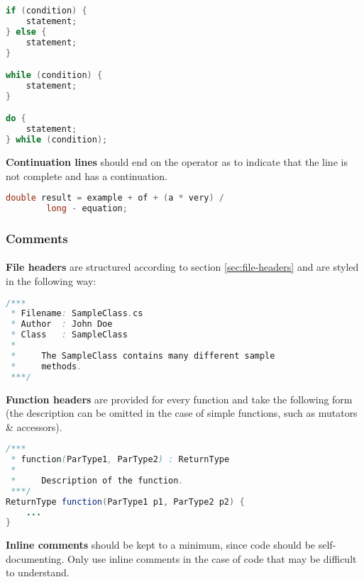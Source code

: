 \documentclass{article}
\begin{document}
    \begin{lstlisting}[language=Java]
if (condition) {
    statement;
} else {
    statement;
}

while (condition) {
    statement;
}

do {
    statement;
} while (condition);
    \end{lstlisting}

    \textbf{Continuation lines} should end on the operator as to indicate that
    the line is not complete and has a continuation.

    \begin{lstlisting}[language=Java]
double result = example + of + (a * very) / 
        long - equation;
    \end{lstlisting}

    \subsubsection{Comments}
    \label{sec:cs-com}

    \paragraph{}
    \textbf{File headers} are structured according to section
    \ref{sec:file-headers} and are styled in the following way:

    \begin{lstlisting}[language=Java]
/***
 * Filename: SampleClass.cs
 * Author  : John Doe
 * Class   : SampleClass
 *
 *     The SampleClass contains many different sample
 *     methods.
 ***/
    \end{lstlisting}

    \textbf{Function headers} are provided for every function and take the
    following form (the description can be omitted in the case of simple
    functions, such as mutators \& accessors).

    \begin{lstlisting}[language=Java]
/***
 * function(ParType1, ParType2) : ReturnType
 *
 *     Description of the function.
 ***/
ReturnType function(ParType1 p1, ParType2 p2) {
    ...
}
    \end{lstlisting}

    \textbf{Inline comments} should be kept to a minimum, since code should be
    self-documenting. Only use inline comments in the case of code that may be
    difficult to understand.

    \newpage
\end{document}

